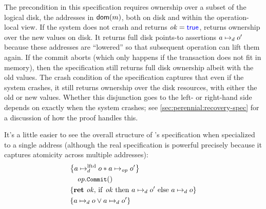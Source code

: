 The precondition in this specification requires ownership over a subset of the
logical disk, the addresses in $\textsf{\upshape dom}(m)$, both on disk and within the
operation-local view. If the system does not crash and returns
$\mathit{ok} = \mathsf{\textcolor{blue}{true}}$,  returns ownership over the new values
on disk. It returns full disk points-to assertions $a \mapsto_d o'$ because
these addresses are ``lowered'' so that subsequent operation can lift them
again. If the commit aborts (which only happens if the transaction does not fit
in memory), then the specification still returns full disk ownership albeit with
the old values. The crash condition of the  specification captures
that even if the system crashes, it still returns ownership over the disk
resources, with either the old or new values. Whether this disjunction goes to
the left- or right-hand side depends on exactly when the system crashes; see
\cref{sec:perennial:recovery-spec} for a discussion of how the proof handles
this.

It's a little easier to see the overall structure of 's specification
when specialized to a single address (although the real specification is powerful
precisely because it captures atomicity across multiple addresses):
\begin{align*}
  \hoareCV{a \mapstoLftd o \sep a \mapstoOp o'} %
  {\mathit{op}.\cc{Commit}()}%
  {\Ret{\mathit{ok}} \mathrm{if~} \mathit{ok} %
  \mathrm{~then~} a \mapstoDisk o' \mathrm{~else~} a \mapstoDisk o}%
  {a \mapstoDisk o \lor a \mapstoDisk o'}
\end{align*}

